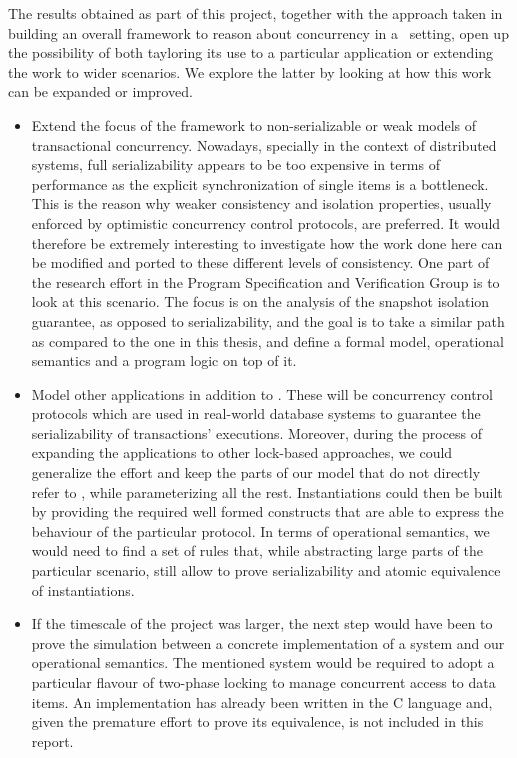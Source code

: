 The results obtained as part of this project, together with the approach taken in building an overall framework to reason about concurrency in a \tpl\ setting, open up the possibility of both tayloring its use to a particular application or extending the work to wider scenarios. We explore the latter by looking at how this work can be expanded or improved.
\begin{itemize}
	\item Extend the focus of the framework to non-serializable or weak models of transactional concurrency. Nowadays, specially in the context of distributed systems, full serializability appears to be too expensive in terms of performance as the explicit synchronization of single items is a bottleneck. This is the reason why weaker consistency and isolation properties, usually enforced by optimistic concurrency control protocols, are preferred. It would therefore be extremely interesting to investigate how the work done here can be modified and ported to these different levels of consistency. One part of the research effort in the Program Specification and Verification Group is to look at this scenario. The focus is on the analysis of the snapshot isolation guarantee, as opposed to serializability, and the goal is to take a similar path as compared to the one in this thesis, and define a formal model, operational semantics and a program logic on top of it.
	
	\item Model other applications in addition to \tpl. These will be concurrency control protocols which are used in real-world database systems to guarantee the serializability of transactions' executions. Moreover, during the process of expanding the applications to other lock-based approaches, we could generalize the effort and keep the parts of our model that do not directly refer to \tpl, while parameterizing all the rest. Instantiations could then be built by providing the required well formed constructs that are able to express the behaviour of the particular protocol. In terms of operational semantics, we would need to find a set of rules that, while abstracting large parts of the particular scenario, still allow to prove serializability and atomic equivalence of instantiations.
	
	\item If the timescale of the project was larger, the next step would have been to prove the simulation between a concrete implementation of a system and our operational semantics. The mentioned system would be required to adopt a particular flavour of two-phase locking to manage concurrent access to data items. An implementation has already been written in the C language and, given the premature effort to prove its equivalence, is not included in this report.
	

\end{itemize}
